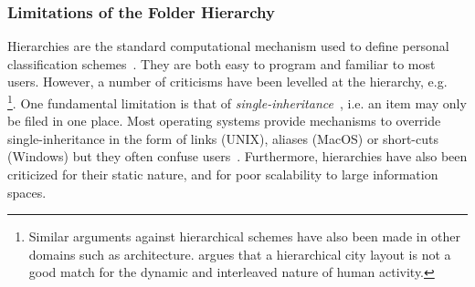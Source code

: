 			
\subsubsection{Limitations of the Folder Hierarchy}
Hierarchies are the standard computational mechanism used to define personal classification schemes~\citep{dourish:99a}. They are both easy to program and familiar to most users. However, 
a number of criticisms have been levelled at the hierarchy, e.g. ~\citep{nielsen:96,bell:02,tn:99,Gelernter:96a,dourish:99a,jr:00}
\footnote{Similar arguments against hierarchical schemes have also been made in other domains such as architecture. \citet{alexander:65} argues that a hierarchical city layout is not a good match for the dynamic and interleaved nature of human activity.}.
One fundamental limitation is that of \textit{single-inheritance}~\citep{nielsen:96,dourish:99a}, i.e. an item may only be filed in one place. Most operating systems provide mechanisms to override single-inheritance in
the form of links (UNIX), aliases (MacOS) or short-cuts (Windows) but they often confuse users~\citep{dourish:99a}. Furthermore, hierarchies have also been criticized for their static nature, and for poor scalability to large information spaces.



